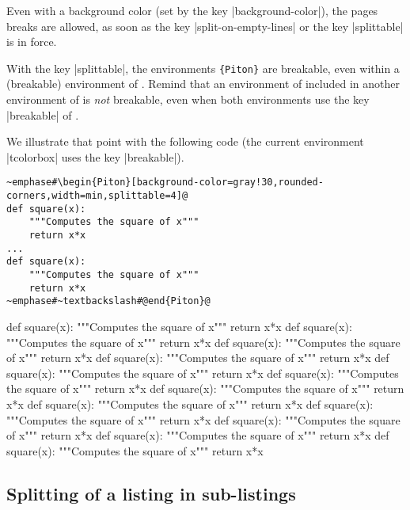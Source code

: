 \documentclass{article}
\begin{document}
\medskip
\begin{tcolorbox}[breakable]
Even with a background color (set by the key |background-color|), the pages
breaks are allowed, as soon as the key |split-on-empty-lines| or the key
|splittable| is in force.

\medskip
With the key |splittable|, the environments
\texttt{\{Piton\}} are breakable, even within a (breakable) environment of
. Remind that an environment of  included in
another environment of  is \emph{not} breakable, even when both
environments use the key |breakable| of .

\medskip
We illustrate that point with the following code (the current environment
|{tcolorbox}| uses the key |breakable|).

\begin{Verbatim}
~emphase#\begin{Piton}[background-color=gray!30,rounded-corners,width=min,splittable=4]@
def square(x):
    """Computes the square of x"""
    return x*x
...
def square(x):
    """Computes the square of x"""
    return x*x
~emphase#~textbackslash#@end{Piton}@
\end{Verbatim}

\bigskip
\begin{Piton}[background-color=gray!30,rounded-corners,width=min,splittable=4]
def square(x):
    """Computes the square of x"""
    return x*x
def square(x):
    """Computes the square of x"""
    return x*x
def square(x):
    """Computes the square of x"""
    return x*x
def square(x):
    """Computes the square of x"""
    return x*x 
def square(x):
    """Computes the square of x"""
    return x*x
def square(x):
    """Computes the square of x"""
    return x*x
def square(x):
    """Computes the square of x"""
    return x*x
def square(x):
    """Computes the square of x"""
    return x*x
def square(x):
    """Computes the square of x"""
    return x*x
def square(x):
    """Computes the square of x"""
    return x*x
def square(x):
    """Computes the square of x"""
    return x*x
def square(x):
    """Computes the square of x"""
    return x*x
\end{Piton}

\end{tcolorbox}

\subsection{Splitting of a listing in sub-listings}
\end{document}

